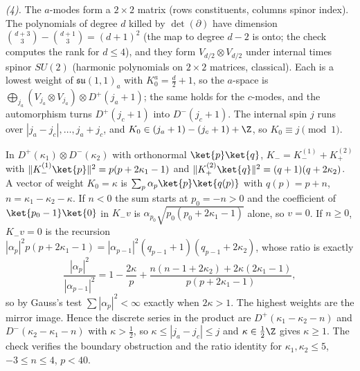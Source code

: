 \emph{(4).} The $a$-modes form a $2 \times 2$ matrix (rows constituents, columns spinor index). The polynomials of degree $d$ killed by $\det(\partial)$ have dimension $\binom{d+3}{3} - \binom{d+1}{3} = (d+1)^{2}$ (the map to degree $d - 2$ is onto; the check computes the rank for $d \le 4$), and they form $V_{d/2} \otimes V_{d/2}$ under internal times spinor $SU(2)$ (harmonic polynomials on $2 \times 2$ matrices, classical). Each is a lowest weight of $\mathfrak{su}(1,1)_{a}$ with $K_{0}^{a} = \tfrac{d}{2} + 1$, so the $a$-space is $\bigoplus_{j_{a}}(V_{j_{a}} \otimes V_{j_{a}}) \otimes D^{+}(j_{a} + 1)$; the same holds for the $c$-modes, and the automorphism turns $D^{+}(j_{c} + 1)$ into $D^{-}(j_{c} + 1)$. The internal spin $j$ runs over $|j_{a} - j_{c}|, \dots, j_{a} + j_{c}$, and $K_{0} \in (j_{a} + 1) - (j_{c} + 1) + \Z$, so $K_{0} \equiv j \pmod 1$.

In $D^{+}(\kappa_{1}) \otimes D^{-}(\kappa_{2})$ with orthonormal $\ket{p}\ket{q}$, $K_{-} = K_{-}^{(1)} + K_{+}^{(2)}$ with $\|K_{-}^{(1)}\ket{p}\|^{2} = p(p + 2\kappa_{1} - 1)$ and $\|K_{+}^{(2)}\ket{q}\|^{2} = (q + 1)(q + 2\kappa_{2})$. A vector of weight $K_{0} = \kappa$ is $\sum_{p}\alpha_{p}\ket{p}\ket{q(p)}$ with $q(p) = p + n$, $n = \kappa_{1} - \kappa_{2} - \kappa$. If $n < 0$ the sum starts at $p_{0} = -n > 0$ and the coefficient of $\ket{p_{0} - 1}\ket{0}$ in $K_{-}v$ is $\alpha_{p_{0}}\sqrt{p_{0}(p_{0} + 2\kappa_{1} - 1)}$ alone, so $v = 0$. If $n \ge 0$, $K_{-}v = 0$ is the recursion $|\alpha_{p}|^{2}p(p + 2\kappa_{1} - 1) = |\alpha_{p-1}|^{2}(q_{p-1} + 1)(q_{p-1} + 2\kappa_{2})$, whose ratio is exactly
\[
\frac{|\alpha_{p}|^{2}}{|\alpha_{p-1}|^{2}} = 1 - \frac{2\kappa}{p} + \frac{n(n - 1 + 2\kappa_{2}) + 2\kappa(2\kappa_{1} - 1)}{p(p + 2\kappa_{1} - 1)},
\]
so by Gauss's test $\sum|\alpha_{p}|^{2} < \infty$ exactly when $2\kappa > 1$. The highest weights are the mirror image. Hence the discrete series in the product are $D^{+}(\kappa_{1} - \kappa_{2} - n)$ and $D^{-}(\kappa_{2} - \kappa_{1} - n)$ with $\kappa > \tfrac12$, so $\kappa \le |j_{a} - j_{c}| \le j$ and $\kappa \in \tfrac12\Z$ gives $\kappa \ge 1$. The check verifies the boundary obstruction and the ratio identity for $\kappa_{1}, \kappa_{2} \le 5$, $-3 \le n \le 4$, $p < 40$.

